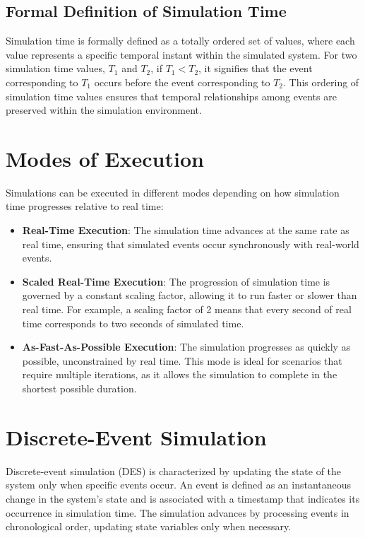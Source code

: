 \subsection{Formal Definition of Simulation Time}

Simulation time is formally defined as a totally ordered set of values, where each value represents a specific temporal instant within the simulated system. For two simulation time values, $T_1$ and $T_2$, if $T_1 < T_2$, it signifies that the event corresponding to $T_1$ occurs before the event corresponding to $T_2$. This ordering of simulation time values ensures that temporal relationships among events are preserved within the simulation environment.

\section{Modes of Execution}

Simulations can be executed in different modes depending on how simulation time progresses relative to real time:

\begin{itemize}
    \item \textbf{Real-Time Execution}: The simulation time advances at the same rate as real time, ensuring that simulated events occur synchronously with real-world events.
    \item \textbf{Scaled Real-Time Execution}: The progression of simulation time is governed by a constant scaling factor, allowing it to run faster or slower than real time. For example, a scaling factor of 2 means that every second of real time corresponds to two seconds of simulated time.
    \item \textbf{As-Fast-As-Possible Execution}: The simulation progresses as quickly as possible, unconstrained by real time. This mode is ideal for scenarios that require multiple iterations, as it allows the simulation to complete in the shortest possible duration.
\end{itemize}

\section{Discrete-Event Simulation}

Discrete-event simulation (DES) is characterized by updating the state of the system only when specific events occur. An event is defined as an instantaneous change in the system's state and is associated with a timestamp that indicates its occurrence in simulation time. The simulation advances by processing events in chronological order, updating state variables only when necessary.

